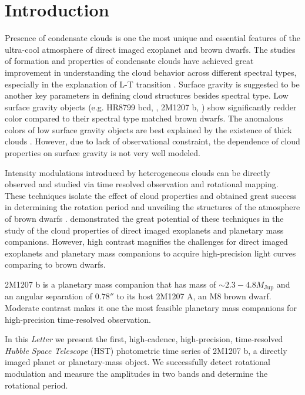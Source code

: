 \documentclass[apj]{emulateapj}
\begin{document}
\section{Introduction}


Presence of condensate clouds is one the most unique and essential
features of the ultra-cool atmosphere of direct imaged exoplanet and
brown dwarfs. The studies of formation and properties of condensate
clouds \citep[e.g.][]{Ackerman2001, Burrows2006a, Helling2008,
  Allard2012} have achieved great improvement in understanding the
cloud behavior across different spectral types, especially in the
explanation of L-T transition \citep[e.g.][]{Burrows2006a,
  Marley2010}.  Surface gravity is suggested to be another key
parameters in defining cloud structures besides spectral type. Low
surface gravity objects (e.g. HR8799 bcd, \cite{Marois2008a}, 2M1207
b, \cite{Chauvin2005}) show significantly redder color compared to
their spectral type matched brown dwarfs.  The anomalous colors of low
surface gravity objects are best explained by the existence of thick
clouds \citep{Barman2011, Skemer2011, Skemer2012}. However, due to
lack of observational constraint, the dependence of cloud properties
on surface gravity is not very well modeled.

Intensity modulations introduced by heterogeneous clouds can be
directly observed and studied via time resolved observation and
rotational mapping. These techniques isolate the effect of cloud
properties and obtained great success in determining the rotation
period and unveiling the structures of the atmosphere of brown dwarfs
\citep[e.g.][]{Apai2013,Buenzli2012,Buenzli2015,Burgasser2013,Radigan2012,Yang2014,Metchev2015}. \cite{Kostov2013}
demonstrated the great potential of these techniques in the study of
the cloud properties of direct imaged exoplanets and planetary mass
companions. However, high contrast magnifies
the challenges for direct imaged exoplanets and planetary mass
companions to acquire high-precision light curves comparing to brown dwarfs.

2M1207 b is a planetary mass companion that has mass of
$\sim 2.3-4.8M_{\mathrm{Jup}}$ \citep[][]{Barman2011} and an angular separation of $0.78''$ to its
host 2M1207 A, an M8 brown dwarf. Moderate contrast  \citep[6.7 mag
in J-band,][]{Mohanty2007} makes it one the most feasible
planetary mass companions for high-precision time-resolved observation.

In this {\em Letter} we present the first, high-cadence, high-precision,
time-resolved {\em Hubble Space Telescope} (HST) photometric time
series of 2M1207 b, a directly imaged planet or
planetary-mass object. We successfully detect rotational modulation
and measure the amplitudes in two bands and determine the rotational
period.
\end{document}
